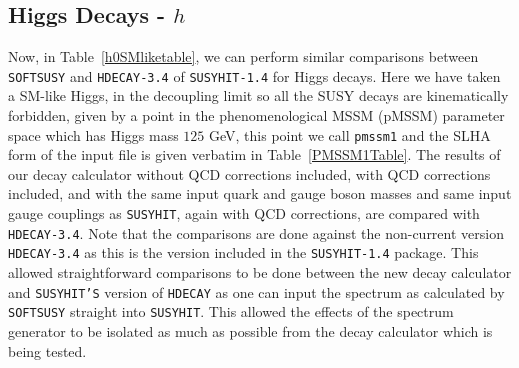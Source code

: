 \documentclass[final,3p,times,pdflatex]{elsarticle}
\def\code#1{{\tt #1}}
\begin{document}
\subsection{Higgs Decays - $h$}

Now, in Table~\ref{h0SMliketable}, we can perform similar comparisons between
{\tt SOFTSUSY} and {\tt HDECAY-3.4} of {\tt SUSYHIT-1.4} for Higgs
decays. Here we have taken a SM-like Higgs, in the decoupling limit so all the
SUSY decays are kinematically forbidden, given by a point in the phenomenological MSSM (pMSSM) parameter space
which has Higgs mass $125$ GeV, this point we call {\tt pmssm1} and the SLHA \cite{Skands:2003cj} form of the input file is given verbatim in Table~\ref{PMSSM1Table}. The results of our decay calculator without QCD
corrections included, with QCD corrections included, and with the same input
quark and gauge boson masses and same input gauge couplings as {\tt SUSYHIT},
again with QCD corrections, are compared with {\tt HDECAY-3.4}. Note that the 
comparisons are done against the non-current version {\tt HDECAY-3.4} as this is the 
version included in the {\tt SUSYHIT-1.4} package. This allowed straightforward comparisons to be done between the new decay
calculator and {\tt SUSYHIT'S} version of \code{HDECAY} as one can input the spectrum as calculated by {\tt SOFTSUSY} straight into {\tt SUSYHIT}. This allowed the effects of the spectrum generator to be isolated as much as possible from the decay calculator which is being tested.
\end{document}

